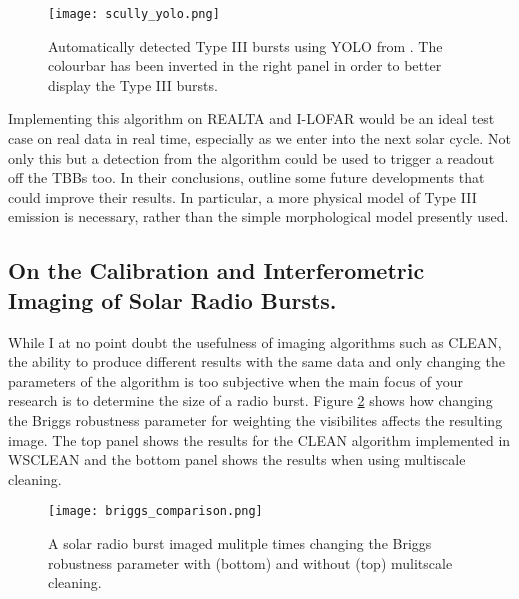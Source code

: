 \begin{figure}[ht]
\centering
\texttt{[image: scully\_yolo.png]}
\caption[Automatically detected Type III bursts using YOLO]{Automatically detected Type III bursts using YOLO from \cite{Scully2021}. The colourbar has been inverted in the right panel in order to better display the Type III bursts. }
\label{fig:yolo}
\end{figure}

Implementing this algorithm on REALTA and I-LOFAR would be an ideal test case on real data in real time, especially as we enter into the next solar cycle. Not only this but a detection from the algorithm could be used to trigger a readout off the TBBs too.
In their conclusions, \cite{Scully2021} outline some future developments that could improve their results. In particular, a more physical model of Type III emission is necessary, rather than the simple morphological model presently used.

\subsection{On the Calibration and Interferometric Imaging of Solar Radio Bursts.}
While I at no point doubt the usefulness of imaging algorithms such as CLEAN, the ability to produce different results with the same data and only changing the parameters of the algorithm is too subjective when the main focus of your research is to determine the size of a radio burst. Figure \ref{fig:briggs_comparison} shows how changing the Briggs robustness parameter for weighting the visibilites affects the resulting image. The top panel shows the results for the CLEAN algorithm implemented in WSCLEAN and the bottom panel shows the results when using multiscale cleaning. 

\begin{figure}[ht]
\centering
\texttt{[image: briggs\_comparison.png]}
\caption[An example of the same solar radio burst imaged with different weighting parameters.]{A solar radio burst imaged mulitple times changing the Briggs robustness parameter with (bottom) and without (top) mulitscale cleaning.}
\label{fig:briggs_comparison}
\end{figure}

